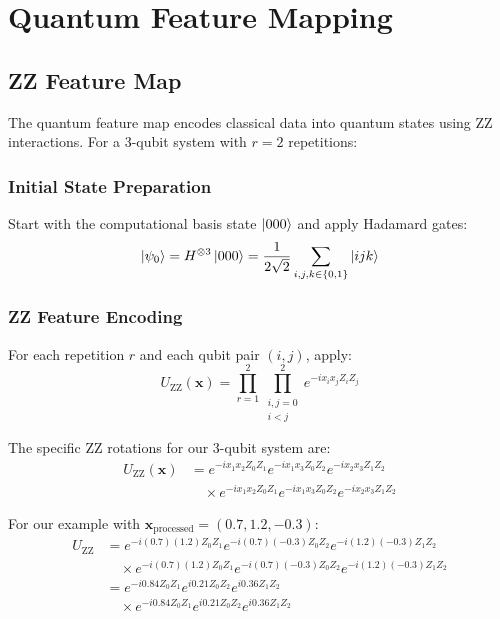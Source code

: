 \documentclass[12pt]{article}
\begin{document}
\section{Quantum Feature Mapping}

\subsection{ZZ Feature Map}
The quantum feature map encodes classical data into quantum states using ZZ interactions. For a 3-qubit system with $r=2$ repetitions:

\subsubsection{Initial State Preparation}
Start with the computational basis state $\ket{000}$ and apply Hadamard gates:
\begin{equation}
\ket{\psi_0} = H^{\otimes 3} \ket{000} = \frac{1}{2\sqrt{2}} \sum_{i,j,k \in \{0,1\}} \ket{ijk}
\end{equation}

\subsubsection{ZZ Feature Encoding}
For each repetition $r$ and each qubit pair $(i,j)$, apply:
\begin{equation}
U_{\text{ZZ}}(\mathbf{x}) = \prod_{r=1}^{2} \prod_{\substack{i,j=0 \\ i<j}}^{2} e^{-i x_i x_j Z_i Z_j}
\end{equation}

The specific ZZ rotations for our 3-qubit system are:
\begin{align}
U_{\text{ZZ}}(\mathbf{x}) &= e^{-i x_1 x_2 Z_0 Z_1} e^{-i x_1 x_3 Z_0 Z_2} e^{-i x_2 x_3 Z_1 Z_2} \\
&\quad \times e^{-i x_1 x_2 Z_0 Z_1} e^{-i x_1 x_3 Z_0 Z_2} e^{-i x_2 x_3 Z_1 Z_2}
\end{align}

For our example with $\mathbf{x}_{\text{processed}} = (0.7, 1.2, -0.3)$:
\begin{align}
U_{\text{ZZ}} &= e^{-i (0.7)(1.2) Z_0 Z_1} e^{-i (0.7)(-0.3) Z_0 Z_2} e^{-i (1.2)(-0.3) Z_1 Z_2} \\
&\quad \times e^{-i (0.7)(1.2) Z_0 Z_1} e^{-i (0.7)(-0.3) Z_0 Z_2} e^{-i (1.2)(-0.3) Z_1 Z_2} \\
&= e^{-i 0.84 Z_0 Z_1} e^{i 0.21 Z_0 Z_2} e^{i 0.36 Z_1 Z_2} \\
&\quad \times e^{-i 0.84 Z_0 Z_1} e^{i 0.21 Z_0 Z_2} e^{i 0.36 Z_1 Z_2}
\end{align}
\end{document}
